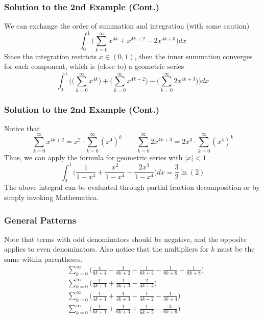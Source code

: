 \documentclass{beamer}
\begin{document}

\begin{frame}
\frametitle{Solution to the 2nd Example (Cont.)}
We can exchange the order of summation and integration (with some caution) 
$$ \int_0^1 \big( \sum_{k=0}^{\infty} x^{4k} + x^{4k+2} - 2x^{4k+3} \big) dx $$
Since the integration restricts $ x \in (0,1) $, then the inner summation converges for each component, which is (close to) a geometric series 
$$ \int_0^1 \bigg( \big( \sum_{k=0}^{\infty} x^{4k} \big) + \big( \sum_{k=0}^{\infty} x^{4k+2} \big) - \big( \sum_{k=0}^{\infty} 2x^{4k+3} \big) \bigg) dx $$
\end{frame}


\begin{frame}
\frametitle{Solution to the 2nd Example (Cont.)}
Notice that 
$$ 
\sum_{k=0}^{\infty} x^{4k+2} = x^2 \cdot \sum_{k=0}^{\infty} {(x^4)}^k \qquad 
\sum_{k=0}^{\infty} 2x^{4k+3} = 2x^3 \cdot \sum_{k=0}^{\infty} {(x^4)}^k
$$
Thus, we can apply the formula for geometric series with $ |x| < 1 $
$$ \int_0^1 \big( \frac{1}{1-x^{4}} + \frac{x^2}{1-x^{4}} - \frac{2x^3}{1-x^{4}} \big) dx = \frac{3}{2} \ln(2) $$
The above integral can be evaluated through partial fraction decomposition or by simply invoking Mathematica.  
\end{frame}


\begin{frame}
\frametitle{General Patterns}
Note that terms with odd denominators should be negative, and the opposite applies to even denominators. Also notice that the multipliers for $k$ must be the same within parentheses. 
\begin{align*}
& \sum_{k=0}^{\infty} \big( \frac{4}{8k+4} - \frac{1}{8k+2} - \frac{1}{8k+4} - \frac{1}{8k+6} - \frac{1}{8k+8} \big) \\ 
& \sum_{k=0}^{\infty} \big( \frac{1}{4k+1} + \frac{1}{4k+3} - \frac{2}{4k+4} \big) \\ 
& \sum_{k=0}^{\infty} \big( \frac{1}{4k+1} + \frac{1}{4k+3} - \frac{1}{4k+2} - \frac{1}{4k+4} \big) \\ 
& \sum_{k=0}^{\infty} \big( \frac{1}{6k+1} + \frac{1}{6k+3} + \frac{1}{6k+5} - \frac{3}{6k+6} \big) 
\end{align*}
\end{frame}

\end{document}
